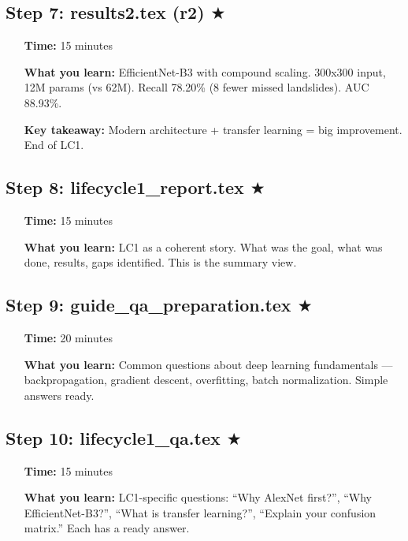 \documentclass[12pt,a4paper]{article}
\begin{document}
\subsection*{Step 7: results2.tex (r2) $\bigstar$}
\begin{itemize}[leftmargin=1.5cm]
    \item[\textbf{Time:}] 15 minutes
    \item[\textbf{What you learn:}] EfficientNet-B3 with compound scaling. 300x300 input, 12M params (vs 62M). Recall 78.20\% (8 fewer missed landslides). AUC 88.93\%.
    \item[\textbf{Key takeaway:}] Modern architecture + transfer learning = big improvement. End of LC1.
\end{itemize}

\subsection*{Step 8: lifecycle1\_report.tex $\bigstar$}
\begin{itemize}[leftmargin=1.5cm]
    \item[\textbf{Time:}] 15 minutes
    \item[\textbf{What you learn:}] LC1 as a coherent story. What was the goal, what was done, results, gaps identified. This is the summary view.
\end{itemize}

\subsection*{Step 9: guide\_qa\_preparation.tex $\bigstar$}
\begin{itemize}[leftmargin=1.5cm]
    \item[\textbf{Time:}] 20 minutes
    \item[\textbf{What you learn:}] Common questions about deep learning fundamentals --- backpropagation, gradient descent, overfitting, batch normalization. Simple answers ready.
\end{itemize}

\subsection*{Step 10: lifecycle1\_qa.tex $\bigstar$}
\begin{itemize}[leftmargin=1.5cm]
    \item[\textbf{Time:}] 15 minutes
    \item[\textbf{What you learn:}] LC1-specific questions: ``Why AlexNet first?'', ``Why EfficientNet-B3?'', ``What is transfer learning?'', ``Explain your confusion matrix.'' Each has a ready answer.
\end{itemize}
\end{document}
